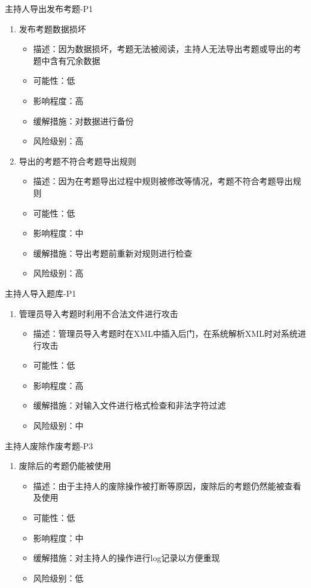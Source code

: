 \documentclass[hyperref, a4paper]{ctexart}
\providecommand{\tightlist}{%
  \setlength{\itemsep}{0pt}\setlength{\parskip}{0pt}}
\begin{document}
主持人导出发布考题-P1

\begin{enumerate}
\def\labelenumi{\arabic{enumi}.}
\tightlist
\item
  发布考题数据损坏

  \begin{itemize}
  \tightlist
  \item
    描述：因为数据损坏，考题无法被阅读，主持人无法导出考题或导出的考题中含有冗余数据
  \item
    可能性：低
  \item
    影响程度：高
  \item
    缓解措施：对数据进行备份
  \item
    风险级别：高
  \end{itemize}
\item
  导出的考题不符合考题导出规则

  \begin{itemize}
  \tightlist
  \item
    描述：因为在考题导出过程中规则被修改等情况，考题不符合考题导出规则
  \item
    可能性：低
  \item
    影响程度：中
  \item
    缓解措施：导出考题前重新对规则进行检查
  \item
    风险级别：高
  \end{itemize}
\end{enumerate}

主持人导入题库-P1

\begin{enumerate}
\def\labelenumi{\arabic{enumi}.}
\tightlist
\item
  管理员导入考题时利用不合法文件进行攻击

  \begin{itemize}
  \tightlist
  \item
    描述：管理员导入考题时在XML中插入后门，在系统解析XML时对系统进行攻击
  \item
    可能性：低
  \item
    影响程度：高
  \item
    缓解措施：对输入文件进行格式检查和非法字符过滤
  \item
    风险级别：中
  \end{itemize}
\end{enumerate}

主持人废除作废考题-P3

\begin{enumerate}
\def\labelenumi{\arabic{enumi}.}
\tightlist
\item
  废除后的考题仍能被使用

  \begin{itemize}
  \tightlist
  \item
    描述：由于主持人的废除操作被打断等原因，废除后的考题仍然能被查看及使用
  \item
    可能性：低
  \item
    影响程度：中
  \item
    缓解措施：对主持人的操作进行log记录以方便重现
  \item
    风险级别：低
  \end{itemize}
\end{enumerate}
\end{document}
